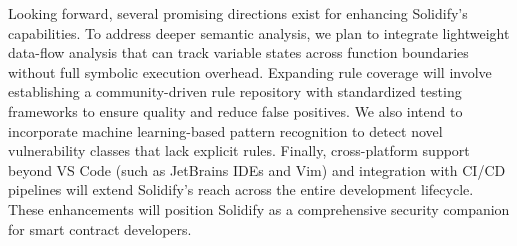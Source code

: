 \documentclass[10pt, a4paper]{article}
\begin{document}
Looking forward, several promising directions exist for enhancing Solidify's capabilities. To address deeper semantic analysis, we plan to integrate lightweight data-flow analysis that can track variable states across function boundaries without full symbolic execution overhead. Expanding rule coverage will involve establishing a community-driven rule repository with standardized testing frameworks to ensure quality and reduce false positives. We also intend to incorporate machine learning-based pattern recognition to detect novel vulnerability classes that lack explicit rules. Finally, cross-platform support beyond VS Code (such as JetBrains IDEs and Vim) and integration with CI/CD pipelines will extend Solidify's reach across the entire development lifecycle. These enhancements will position Solidify as a comprehensive security companion for smart contract developers.
\end{document}
